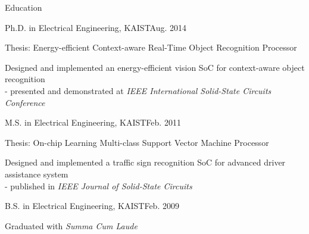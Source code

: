 \documentclass{resume} %
\begin{document}
\begin{section}{Education}

\begin{subsection}{Ph.D. in Electrical Engineering, KAIST}{Aug. 2014}{}{}%
\item Thesis: Energy-efficient Context-aware Real-Time Object Recognition Processor
\item Designed and implemented an energy-efficient vision SoC for context-aware object recognition \\
- presented and demonstrated at \emph{IEEE International Solid-State Circuits Conference}
\end{subsection}

\begin{subsection}{M.S. in Electrical Engineering, KAIST}{Feb. 2011}{}{}%
\item Thesis: On-chip Learning Multi-class Support Vector Machine Processor
\item Designed and implemented a traffic sign recognition SoC for advanced driver assistance system \\
- published in \emph{IEEE Journal of Solid-State Circuits}
\end{subsection}

\begin{subsection}{B.S. in Electrical Engineering, KAIST}{Feb. 2009}{}{}
\item Graduated with \emph{Summa Cum Laude}
\end{subsection}

\end{section}
\end{document}
